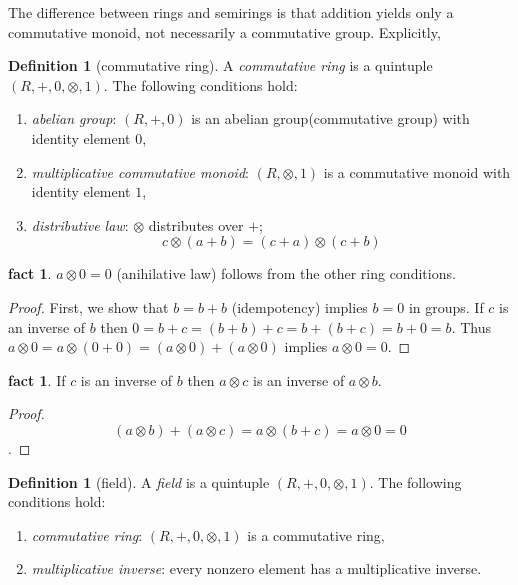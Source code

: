 \documentclass{article}
\theoremstyle{definition}
\newtheorem{fact}[theorem]{fact}
\newtheorem{definition}[theorem]{Definition}
\begin{document}
The difference between rings and semirings
is that addition yields only a commutative monoid, 
not necessarily a commutative group. Explicitly,

\begin{definition}[commutative ring]
A {\em commutative ring} is a quintuple $(R,+,0,\otimes,1) $.
The following conditions hold:
%
\begin{enumerate} 
\item {\em abelian group}:
$(R,+,0)$ is an abelian group(commutative group) with identity element $0$,
\item {\em multiplicative commutative monoid}:
$(R,\otimes,1)$ is a commutative monoid with identity element $1$, 
\item {\em distributive law}:
$\otimes$ distributes over $+$;
\[ c \otimes (a + b) = (c+a) \otimes (c+b) \]
\end{enumerate}
\end{definition}

\begin{fact}
$a \otimes 0 = 0$ (anihilative law) follows from the other ring conditions.
\end{fact}
\begin{proof}
First, we show that $b = b+b$ (idempotency) implies $b = 0$
in groups. 
If $c$ is an inverse of $b$ 
then $ 0 = b + c = (b + b) + c = b + (b + c) = b + 0 = b$.
Thus 
$ a \otimes 0 = a \otimes (0 + 0) =  (a \otimes 0) + (a \otimes 0) $
implies $a \otimes 0 = 0$. 
\end{proof}

\begin{fact}
If $c$ is an inverse of $b$ 
then $a \otimes c$ is an inverse of $a \otimes b$. 
\end{fact}
\begin{proof}
\[ (a \otimes b) + (a \otimes c) = a \otimes (b + c) = a \otimes 0 = 0 \].
\end{proof}

\begin{definition}[field]
A {\em field} is a quintuple $(R,+,0,\otimes,1)$.
The following conditions hold:
%
\begin{enumerate} 
\item {\em commutative ring}:
$(R,+,0,\otimes,1)$ is a commutative ring,
\item {\em multiplicative inverse}: every nonzero element 
has a multiplicative inverse. 
\end{enumerate}
\end{definition}
\end{document}
